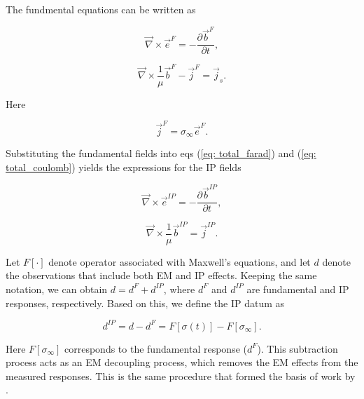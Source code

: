 \documentclass[letterpaper,11pt]{article}
\newcommand{\curl}{{\vec \nabla}\times}
\newcommand{\siginf}{\sigma_\infty}
\renewcommand {\j}  { {\vec j} }
\renewcommand {\b}  { {\vec b} }
\newcommand {\e}  { {\vec e} }
\newcommand{\dip}{d^{IP}}
\begin{document}
The fundmental equations can be written as
\begin{linenomath*}
\begin{equation}
  \curl \e^{F} = -\frac{\partial \b^{F}}{\partial t},
  \label{eq: eq_primary_farad}
\end{equation}
\end{linenomath*}
\begin{linenomath*}
\begin{equation}
  \curl{\frac{1}{\mu}\b^{F}} -\j^{F} = \j_s.
  \label{eq: eq_primary_coulomb}
\end{equation}
\end{linenomath*}
Here
\begin{linenomath*}
\begin{equation}
  \j^{F} = \siginf\e^{F}.
  \label{eq: jF}
\end{equation}
\end{linenomath*}

Substituting the fundamental fields into eqs (\ref{eq: total_farad}) and (\ref{eq: total_coulomb}) yields the expressions for the IP fields 
\begin{linenomath*}
\begin{equation}
  \curl \e^{IP} = -\frac{\partial \b^{IP}}{\partial t},
  \label{eq: eq_secondary_farad}
\end{equation}
\end{linenomath*}
\begin{linenomath*}
\begin{equation}
  \curl{\frac{1}{\mu}\b^{IP}} = \j^{IP}.
  \label{eq: eq_secondary_coulomb}
\end{equation}
\end{linenomath*}

Let $F[\cdot]$ denote operator associated with Maxwell’s equations, and let $d$ denote the observations that include both EM and IP effects. 
Keeping the same notation, we can obtain $d = d^{F} + \dip$, where $d^F$ and $\dip$ are fundamental and IP responses, respectively. 
Based on this, we define the IP datum as 
\begin{linenomath*}
\begin{equation}
  \dip = d - d^{F} = F[\sigma(t)]-F[\siginf].
    \label{eq: IPdatum_syn}
\end{equation}
\end{linenomath*}
Here $F[\siginf]$ corresponds to the fundamental response ($d^F$). 
This subtraction process acts as an EM decoupling process, which removes the EM effects from the measured responses. This is the same procedure that formed the basis of work by \cite{routh2001}. 
\end{document}
